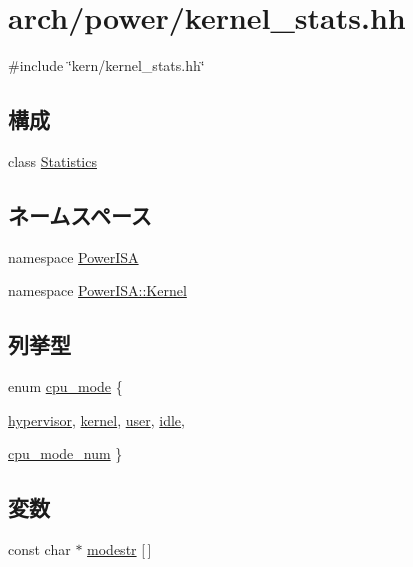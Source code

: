 \hypertarget{arch_2power_2kernel__stats_8hh}{
\section{arch/power/kernel\_\-stats.hh}
\label{arch_2power_2kernel__stats_8hh}
}
{\ttfamily \#include \char`\"{}kern/kernel\_\-stats.hh\char`\"{}}\par
\subsection*{構成}
\begin{DoxyCompactItemize}
\item 
class \hyperlink{classPowerISA_1_1Kernel_1_1Statistics}{Statistics}
\end{DoxyCompactItemize}
\subsection*{ネームスペース}
\begin{DoxyCompactItemize}
\item 
namespace \hyperlink{namespacePowerISA}{PowerISA}
\item 
namespace \hyperlink{namespacePowerISA_1_1Kernel}{PowerISA::Kernel}
\end{DoxyCompactItemize}
\subsection*{列挙型}
\begin{DoxyCompactItemize}
\item 
enum \hyperlink{namespacePowerISA_1_1Kernel_aa1fc3805dac6f71f457fbbc263105bf6}{cpu\_\-mode} \{ \par
\hyperlink{namespacePowerISA_1_1Kernel_aa1fc3805dac6f71f457fbbc263105bf6a91b640fcbd5e0f6c8310b554caa00d4b}{hypervisor}, 
\hyperlink{namespacePowerISA_1_1Kernel_aa1fc3805dac6f71f457fbbc263105bf6adb0339d028e596254368234e5ab09f9d}{kernel}, 
\hyperlink{namespacePowerISA_1_1Kernel_aa1fc3805dac6f71f457fbbc263105bf6a04981b8c09a50ccfb1d92fc11b81c36a}{user}, 
\hyperlink{namespacePowerISA_1_1Kernel_aa1fc3805dac6f71f457fbbc263105bf6a0e9a37114c0e458d28d52f06ec0f2242}{idle}, 
\par
\hyperlink{namespacePowerISA_1_1Kernel_aa1fc3805dac6f71f457fbbc263105bf6a4572f7cf10830e04921c8896f22102ba}{cpu\_\-mode\_\-num}
 \}
\end{DoxyCompactItemize}
\subsection*{変数}
\begin{DoxyCompactItemize}
\item 
const char $\ast$ \hyperlink{namespacePowerISA_1_1Kernel_aaab5092bc6d1c40a90ff4c7450649ace}{modestr} \mbox{[}$\,$\mbox{]}
\end{DoxyCompactItemize}
